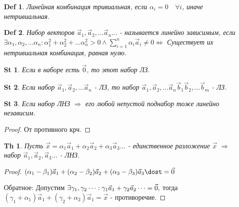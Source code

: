 \documentclass[a5paper, 10pt]{article}
\theoremstyle{plain}
\newtheorem*{theorem}{Th}
\newtheorem*{statement}{St}
\newtheorem{definition}{Def}
\newcommand{\Rarrow}{\Rightarrow}
\newcommand{\Lrarrow}{\Leftrightarrow}
\begin{document}
    \begin{definition}
    Линейная комбинация тривиальная, если $ \alpha_i = 0 \quad \forall i $,
    иначе нетривиальная.
    \end{definition}

    \begin{definition}
    Набор векторов $ \vec{a}_1, \vec{a}_2, \dots \vec{a}_n \dots $
    - называется линейно зависимым, если
    $ \exists \alpha_1, \alpha_2, \dots \alpha_n:
        \alpha_1^2 + \alpha_2^2 + \dots \alpha_n^2 > 0 \land
        \sum_{i = 1}^n \alpha_i \vec{a}_i \neq 0 \Lrarrow $
        Существует их нетривиальная комбинация, равная нулю.
    \end{definition}

    \begin{statement}
    Если в наборе есть $ \vec{0} $, то этот набор ЛЗ.
    \end{statement}

    \begin{statement}
    Если набор
    $ \vec{a}_1, \vec{a}_2, \dots \vec{a}_n $ - ЛЗ, то набор \newline
    $ \vec{a}_1, \vec{a}_2, \dots \vec{a}_n \vec{b}_1 \vec{b}_2, \dots \vec{b}_m $
    - ЛЗ.
    \end{statement}

    \begin{statement}
    Если набор ЛНЗ $ \Rarrow $ его любой непустой поднабор тоже линейно независим.
    \end{statement}

    \begin{proof}
        От противного крч.
    \end{proof}

    \begin{theorem}
        Пусть $ \vec{x} =
            \alpha_1 \vec{a}_1 +
            \alpha_2 \vec{a}_2 +
            \alpha_3 \vec{a}_3
        \dots $ - единственное разложение $ \vec{x} $ $ \Rarrow $ набор $
            \vec{a}_1,
            \vec{a}_2,
            \vec{a}_3
        \dots $ - ЛНЗ.
    \end{theorem}

    \begin{proof}
        $
        (\alpha_1 - \beta_1) \vec{a}_1 +
        (\alpha_2 - \beta_2) \vec{a}_2 +
        (\alpha_3 - \beta_3) \vec{a}_3 \dost = \vec{0} $

        Обратное: Допустим $ \exists
            \gamma_1,
            \gamma_2 \dots: \\
            \gamma_1 \vec{a}_1 +
            \gamma_2 \vec{a}_2 \dots = \vec{0}, $ тогда $
            (\gamma_1 + \alpha_1) \vec{a}_1 +
            (\gamma_2 + \alpha_2) \vec{a}_1 = \vec{x} $ - противоречие.
    \end{proof}
\end{document}
